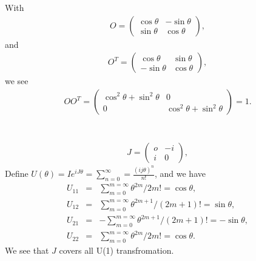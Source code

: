 \documentclass[11pt]{article}
\begin{document}
\section {}
With
\begin{eqnarray}
  O=
  \begin{pmatrix}
    \cos \theta & -\sin \theta\\
    \sin \theta&\cos \theta
  \end{pmatrix},
\end{eqnarray}
and
\begin{eqnarray}
  O^T=
  \begin{pmatrix}
    \cos \theta & \sin \theta\\
    -\sin \theta&\cos \theta
  \end{pmatrix},
\end{eqnarray}
we see
\begin{eqnarray}
  O O^T=
  \begin{pmatrix}
    \cos^2 \theta + \sin^2 \theta &0 \\
    0 & \cos^2 \theta + \sin^2 \theta
  \end{pmatrix}
  = 1.
\end{eqnarray}

\section{ }

\begin{eqnarray}
  J=
  \begin{pmatrix}
    o & -i\\
    i & 0
  \end{pmatrix},
\end{eqnarray}
Define $U(\theta)=I e^{i J \theta}=\sum_{n=0}^\infty=\frac{(ij\theta)^n}{n!}$, and we have
\begin{eqnarray}
U_{11}&=&\sum_{m=0}^{m=\infty} \theta ^{2m}/{2m}!=\cos \theta,\nonumber \\
U_{12}&=&\sum_{m=0}^{m=\infty} \theta ^{2m+1}/(2m+1)!=\sin \theta,\nonumber \\
U_{21}&=&-\sum_{m=0}^{m=\infty} \theta ^{2m+1}/(2m+1)!=-\sin \theta,\nonumber \\
U_{22}&=&\sum_{m=0}^{m=\infty} \theta ^{2m}/{2m}!=\cos \theta.
\end{eqnarray}
We see that $J$ covers all U(1) transfromation.
\end{document}
